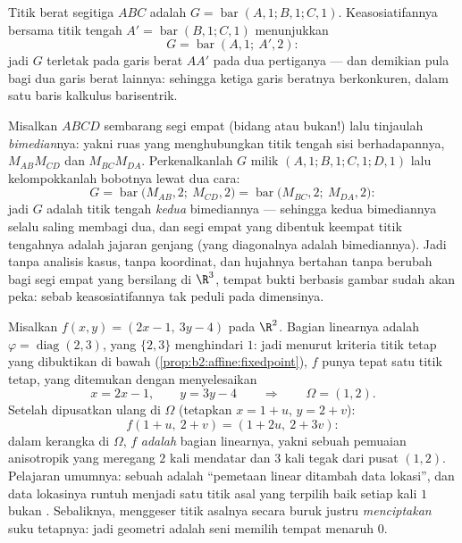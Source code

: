 \begin{example}\label{ex:b2:affine:median}
Titik berat segitiga $ABC$ adalah  $G =
\operatorname{bar}(A,1; B,1; C,1)$. Keasosiatifannya bersama
titik tengah $A' = \operatorname{bar}(B, 1; C, 1)$ menunjukkan
\[
G = \operatorname{bar}(A, 1;\ A', 2) :
\]
jadi $G$ terletak pada garis berat $AA'$ pada dua pertiganya --- dan demikian pula
bagi dua garis berat lainnya: sehingga ketiga garis beratnya berkonkuren, dalam
satu baris kalkulus barisentrik.
\end{example}

\begin{example}\label{ex:b2:affine:bimedians}
Misalkan $ABCD$ sembarang segi empat (bidang atau bukan!) lalu tinjaulah
\emph{bimedian}nya: yakni ruas yang menghubungkan titik tengah sisi
berhadapannya, $M_{AB}M_{CD}$ dan $M_{BC}M_{DA}$. Perkenalkanlah
 $G$ milik $(A,1; B,1; C,1; D,1)$ lalu kelompokkanlah
bobotnya lewat dua cara:
\[
G = \operatorname{bar}\bigl(M_{AB}, 2;\ M_{CD}, 2\bigr)
= \operatorname{bar}\bigl(M_{BC}, 2;\ M_{DA}, 2\bigr) :
\]
jadi $G$ adalah titik tengah \emph{kedua} bimediannya --- sehingga kedua
bimediannya selalu saling membagi dua, dan segi empat yang dibentuk
keempat titik tengahnya adalah jajaran genjang (yang diagonalnya adalah
bimediannya). Jadi tanpa analisis kasus, tanpa koordinat, dan
hujahnya bertahan tanpa berubah bagi segi empat yang bersilang di
$\R^3$, tempat bukti berbasis gambar sudah akan
peka: sebab keasosiatifannya tak peduli pada dimensinya.
\end{example}

\begin{example}\label{ex:b2:affine:dilation}
Misalkan $f(x, y) = (2x - 1,\ 3y - 4)$ pada $\R^2$. Bagian linearnya
adalah $\varphi = \operatorname{diag}(2, 3)$, yang 
$\{2, 3\}$ menghindari $1$: jadi menurut kriteria titik tetap yang dibuktikan
di bawah (\cref{prop:b2:affine:fixedpoint}), $f$ punya tepat satu
titik tetap, yang ditemukan dengan menyelesaikan
\[
x = 2x - 1, \qquad y = 3y - 4
\qquad\Longrightarrow\qquad \Omega = (1, 2).
\]
Setelah dipusatkan ulang di $\Omega$ (tetapkan $x = 1 + u$, $y = 2 + v$):
\[
f(1 + u,\ 2 + v) = (1 + 2u,\ 2 + 3v) :
\]
dalam kerangka di $\Omega$, $f$ \emph{adalah} bagian linearnya, yakni sebuah
pemuaian anisotropik yang meregang $2$ kali mendatar dan $3$ kali
tegak dari pusat $(1, 2)$. Pelajaran umumnya: sebuah
 adalah ``pemetaan linear ditambah data lokasi'', dan
data lokasinya runtuh menjadi satu titik asal yang terpilih baik setiap kali
$1$ bukan . Sebaliknya, menggeser titik asalnya
secara buruk justru \emph{menciptakan} suku tetapnya: jadi geometri  adalah
seni memilih tempat menaruh $0$.
\end{example}

